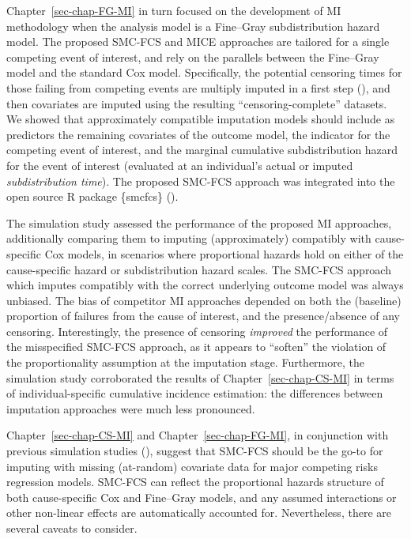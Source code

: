 \documentclass[
  letterpaper,
  paper=240mm:170mm,
  twoside=true,
  open=right,
  fontsize=10pt,
  pagesize=false,
  BCOR=15mm,
  DIV=14,
  headinclude=true,
  footinclude=false,
  headsepline=on]{scrbook}
\begin{document}
Chapter~\ref{sec-chap-FG-MI} in turn focused on the development of MI
methodology when the analysis model is a Fine--Gray subdistribution
hazard model. The proposed SMC-FCS and MICE approaches are tailored for
a single competing event of interest, and rely on the parallels between
the Fine--Gray model and the standard Cox model. Specifically, the
potential censoring times for those failing from competing events are
multiply imputed in a first step
(), and then covariates are imputed using the resulting
``censoring-complete'' datasets. We showed that approximately compatible
imputation models should include as predictors the remaining covariates
of the outcome model, the indicator for the competing event of interest,
and the marginal cumulative subdistribution hazard for the event of
interest (evaluated at an individual's actual or imputed
\emph{subdistribution time}). The proposed SMC-FCS approach was
integrated into the open source R package \{smcfcs\}
().

The simulation study assessed the performance of the proposed MI
approaches, additionally comparing them to imputing (approximately)
compatibly with cause-specific Cox models, in scenarios where
proportional hazards hold on either of the cause-specific hazard or
subdistribution hazard scales. The SMC-FCS approach which imputes
compatibly with the correct underlying outcome model was always
unbiased. The bias of competitor MI approaches depended on both the
(baseline) proportion of failures from the cause of interest, and the
presence/absence of any censoring. Interestingly, the presence of
censoring \emph{improved} the performance of the misspecified SMC-FCS
approach, as it appears to ``soften'' the violation of the
proportionality assumption at the imputation stage. Furthermore, the
simulation study corroborated the results of
Chapter~\ref{sec-chap-CS-MI} in terms of individual-specific cumulative
incidence estimation: the differences between imputation approaches were
much less pronounced.

Chapter~\ref{sec-chap-CS-MI} and Chapter~\ref{sec-chap-FG-MI}, in
conjunction with previous simulation studies
(), suggest that SMC-FCS should be the go-to for imputing
with missing (at-random) covariate data for major competing risks
regression models. SMC-FCS can reflect the proportional hazards
structure of both cause-specific Cox and Fine--Gray models, and any
assumed interactions or other non-linear effects are automatically
accounted for. Nevertheless, there are several caveats to consider.
\end{document}
